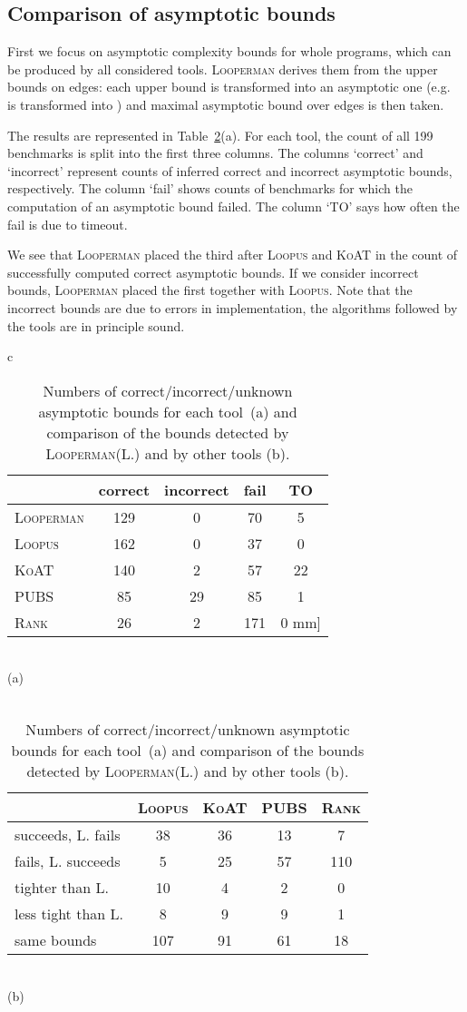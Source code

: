 \documentclass[10pt,a4paper]{article}
\newcommand{\Looperman}{\textsc{Looperman}\xspace}
\newcommand{\Loopus}{\textsc{Loopus}\xspace}
\newcommand{\KoAT}{\textsc{KoAT}\xspace}
\newcommand{\PUBS}{\textsc{PUBS}\xspace}
\newcommand{\Rank}{\textsc{Rank}\xspace}
\begin{document}
\subsection{Comparison of asymptotic bounds}\label{sec:evalAsympt}

First we focus on asymptotic complexity bounds for whole programs,
which can be produced by all considered tools. \Looperman derives them
from the upper bounds on edges: each upper bound is transformed into
an asymptotic one (e.g.~ is transformed
into ) and maximal asymptotic bound over edges is
then taken.

The results are represented in Table~\ref{tab:benchAsymp}(a). For each tool,
the count of all 199 benchmarks is split into the first three columns. The
columns `correct' and `incorrect' represent counts of inferred
correct and incorrect asymptotic bounds, respectively. The column
`fail' shows counts of benchmarks for which the computation of an
asymptotic bound failed. The column `TO' says how often the fail is
due to timeout. 

We see that \Looperman placed the third after \Loopus and \KoAT in the count
of successfully computed correct asymptotic bounds.  If we consider
incorrect bounds, \Looperman placed the first together with \Loopus. Note
that the incorrect bounds are due to errors in implementation, the
algorithms followed by the tools are in principle sound.


\begin{table}[t]
\begin{center}
\begin{tabular}{c}
\begin{tabular}{l|cccc}
& correct & incorrect & fail & TO \\
\hline
\Looperman & 129 & 0 & 70 & 5  \\
\Loopus & 162 & 0 & 37 & 0  \\
\KoAT & 140 & 2 & 57&22 \\
\PUBS & 85 & 29 & 85&1 \\
\Rank & 26 & 2 & 171&0 \1mm]
\end{tabular}
\\
(a)
\\\\
\setlength{\tabcolsep}{4.5pt}
\begin{tabular}{l|cccc}
& \Loopus & \KoAT & \PUBS & \Rank\\
\hline
succeeds, \textsc{L.} fails & 38 & 36 & 13 & 7 \\
fails, \textsc{L.} succeeds & 5 & 25 & 57 & 110 \\
tighter than \textsc{L.} & 10 & 4 & 2 & 0 \\
less tight than \textsc{L.} & 8 & 9 & 9 & 1 \\
same bounds & 107 & 91 & 61 & 18
\end{tabular}
\\
(b)
\end{tabular}
\end{center}
\caption{Numbers of
  correct/incorrect/unknown asymptotic bounds for each tool~(a) and comparison
  of the bounds detected by \Looperman (\textsc{L.}) and by other tools (b).}
\label{tab:benchAsymp}
\end{table}
\end{document}
